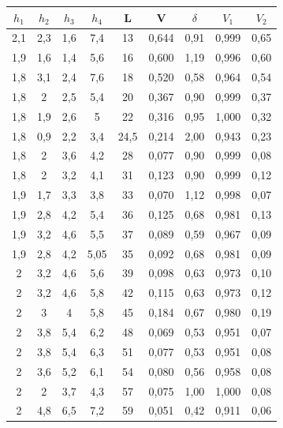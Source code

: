 \documentclass[a4paper,12pt]{article}
\begin{document}
\begin{table}[h!]
\centering
\begin{tabular}{|c|c|c|c|c|c|c|c|c|}
\hline
$h_1$ & $h_2$ & $h_3$ & $h_4$ & L    & V     & $\delta$ & $V_1$ & $V_2$ \\ \hline
2,1   & 2,3   & 1,6   & 7,4   & 13   & 0,644 & 0,91     & 0,999 & 0,65  \\ \hline
1,9   & 1,6   & 1,4   & 5,6   & 16   & 0,600 & 1,19     & 0,996 & 0,60  \\ \hline
1,8   & 3,1   & 2,4   & 7,6   & 18   & 0,520 & 0,58     & 0,964 & 0,54  \\ \hline
1,8   & 2     & 2,5   & 5,4   & 20   & 0,367 & 0,90     & 0,999 & 0,37  \\ \hline
1,8   & 1,9   & 2,6   & 5     & 22   & 0,316 & 0,95     & 1,000 & 0,32  \\ \hline
1,8   & 0,9   & 2,2   & 3,4   & 24,5 & 0,214 & 2,00     & 0,943 & 0,23  \\ \hline
1,8   & 2     & 3,6   & 4,2   & 28   & 0,077 & 0,90     & 0,999 & 0,08  \\ \hline
1,8   & 2     & 3,2   & 4,1   & 31   & 0,123 & 0,90     & 0,999 & 0,12  \\ \hline
1,9   & 1,7   & 3,3   & 3,8   & 33   & 0,070 & 1,12     & 0,998 & 0,07  \\ \hline
1,9   & 2,8   & 4,2   & 5,4   & 36   & 0,125 & 0,68     & 0,981 & 0,13  \\ \hline
1,9   & 3,2   & 4,6   & 5,5   & 37   & 0,089 & 0,59     & 0,967 & 0,09  \\ \hline
1,9   & 2,8   & 4,2   & 5,05  & 35   & 0,092 & 0,68     & 0,981 & 0,09  \\ \hline
2     & 3,2   & 4,6   & 5,6   & 39   & 0,098 & 0,63     & 0,973 & 0,10  \\ \hline
2     & 3,2   & 4,6   & 5,8   & 42   & 0,115 & 0,63     & 0,973 & 0,12  \\ \hline
2     & 3     & 4     & 5,8   & 45   & 0,184 & 0,67     & 0,980 & 0,19  \\ \hline
2     & 3,8   & 5,4   & 6,2   & 48   & 0,069 & 0,53     & 0,951 & 0,07  \\ \hline
2     & 3,8   & 5,4   & 6,3   & 51   & 0,077 & 0,53     & 0,951 & 0,08  \\ \hline
2     & 3,6   & 5,2   & 6,1   & 54   & 0,080 & 0,56     & 0,958 & 0,08  \\ \hline
2     & 2     & 3,7   & 4,3   & 57   & 0,075 & 1,00     & 1,000 & 0,08  \\ \hline
2     & 4,8   & 6,5   & 7,2   & 59   & 0,051 & 0,42     & 0,911 & 0,06  \\ \hline

\end{tabular}
\end{table}
\end{document}
